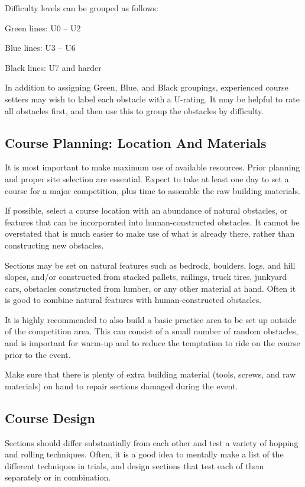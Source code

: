 Difficulty levels can be grouped as follows:

Green lines: U0 – U2

Blue lines: U3 – U6 

Black lines: U7 and harder

In addition to assigning Green, Blue, and Black groupings, experienced course setters may wish to label each obstacle with a U-rating.
It may be helpful to rate all obstacles first, and then use this to group the obstacles by difficulty.

\subsection{Course Planning: Location And Materials}
It is most important to make maximum use of available resources. 
Prior planning and proper site selection are essential.
Expect to take at least one day to set a course for a major competition, plus time to assemble the raw building materials.

If possible, select a course location with an abundance of natural obstacles, or features that can be incorporated into human-constructed obstacles. 
It cannot be overstated that is much easier to make use of what is already there, rather than constructing new obstacles.

Sections may be set on natural features such as bedrock, boulders, logs, and hill slopes, and/or constructed from stacked pallets, railings, truck tires, junkyard cars, obstacles constructed from lumber, or any other material at hand. 
Often it is good to combine natural features with human-constructed obstacles.

It is highly recommended to also build a basic practice area to be set up outside of the competition area. 
This can consist of a small number of random obstacles, and is important for warm-up and to reduce the temptation to ride on the course prior to the event.

Make sure that there is plenty of extra building material (tools, screws, and raw materials) on hand to repair sections damaged during the event.

\subsection{Course Design}
Sections should differ substantially from each other and test a variety of hopping and rolling techniques. 
Often, it is a good idea to mentally make a list of the different techniques in trials, and design sections that test each of them separately or in combination.

